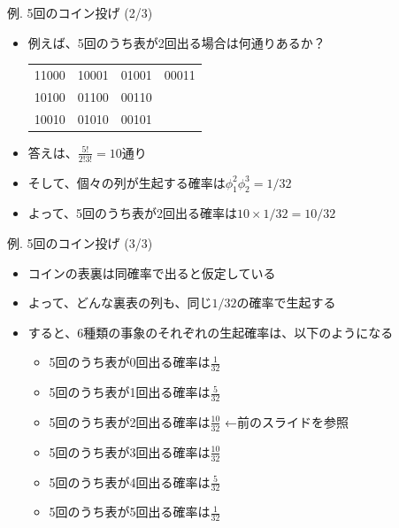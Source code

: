 \documentclass[aspectratio=169,unicode,dvipdfmx,14pt]{beamer}
\begin{document}
\begin{frame}{例. 5回のコイン投げ (2/3)}
\begin{itemize}
\item 例えば、5回のうち表が2回出る場合は何通りあるか？
\begin{table}[t]
\Large
\begin{center}
\begin{tabular}{cccc}
11000 & 10001 & 01001 & 00011\\
10100 & 01100 & 00110 & \\
10010 & 01010 & 00101 &
\end{tabular}
\end{center}
\label{tbl:binomial_ex}
\end{table}
\vspace{-.1in}
\item 答えは、$\frac{5!}{2!3!}=10$通り
\item そして、個々の列が生起する確率は$\phi_1^2\phi_2^3=1/32$
\item よって、5回のうち表が2回出る確率は$10\times1/32=10/32$
\end{itemize}
\end{frame}

\begin{frame}{例. 5回のコイン投げ (3/3)}
\begin{itemize}
\item コインの表裏は同確率で出ると仮定している
\item よって、どんな裏表の列も、同じ$1/32$の確率で生起する
\item すると、6種類の事象のそれぞれの生起確率は、以下のようになる
\begin{itemize}
\item 5回のうち表が0回出る確率は$\frac{1}{32}$
\item 5回のうち表が1回出る確率は$\frac{5}{32}$
\item 5回のうち表が2回出る確率は$\frac{10}{32}$ ←前のスライドを参照
\item 5回のうち表が3回出る確率は$\frac{10}{32}$
\item 5回のうち表が4回出る確率は$\frac{5}{32}$
\item 5回のうち表が5回出る確率は$\frac{1}{32}$
\end{itemize}
\end{itemize}
\end{frame}
\end{document}

